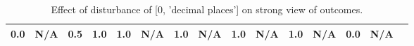 \begin{table}
\begin{tabular}{l|cc|cc|cc|cc|cc|cc|cc}
\cellcolor{Bittersweet}0.0&\cellcolor{Bittersweet}N/A&\cellcolor{Bittersweet}0.5&\cellcolor{Bittersweet}1.0&\cellcolor{Bittersweet}1.0&\cellcolor{Bittersweet}N/A&\cellcolor{Bittersweet}1.0&\cellcolor{Bittersweet}N/A&\cellcolor{Bittersweet}1.0&\cellcolor{Bittersweet}N/A&\cellcolor{Bittersweet}1.0&\cellcolor{Bittersweet}N/A&\cellcolor{Bittersweet}0.0&\cellcolor{Bittersweet}N/A\\\bottomrule\end{tabular}\caption{Effect of disturbance of [0, 'decimal places'] on strong view of outcomes.}\end{table}